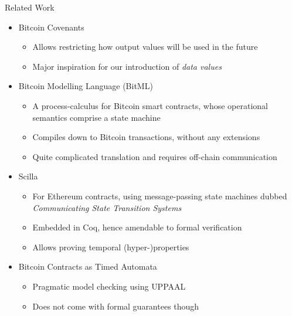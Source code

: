 \begin{frame}{Related Work}

\begin{itemize}
\item \alert{Bitcoin Covenants}
  \begin{itemize}
  \item Allows restricting how output values will be used in the future
  \item Major inspiration for our introduction of \textit{data values}
  \end{itemize}
\item \alert{Bitcoin Modelling Language (BitML)}
  \begin{itemize}
  \item A process-calculus for Bitcoin smart contracts, whose operational semantics comprise a state machine
  \item Compiles down to Bitcoin transactions, without any extensions
  \item Quite complicated translation and requires off-chain communication
  \end{itemize}
\item \alert{Scilla}
  \begin{itemize}
  \item For Ethereum contracts, using message-passing state machines dubbed \textit{Communicating State Transition Systems}
  \item Embedded in Coq, hence amendable to formal verification
  \item Allows proving temporal (hyper-)properties
  \end{itemize}
\item \alert{Bitcoin Contracts as Timed Automata}
  \begin{itemize}
  \item Pragmatic model checking using \textsc{UPPAAL}
  \item Does not come with formal guarantees though
  \end{itemize}
\end{itemize}

\end{frame}

